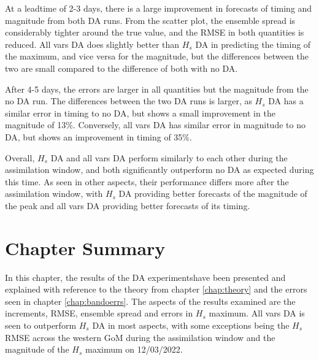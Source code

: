At a leadtime of 2-3 days, there is a large improvement in forecasts of timing and magnitude from both DA runs. From the scatter plot, the ensemble spread is considerably tighter around the true value, and the RMSE in both quantities is reduced. All vars DA does slightly better than $H_s$ DA in predicting the timing of the maximum, and vice versa for the magnitude, but the differences between the two are small compared to the difference of both with no DA.

After 4-5 days, the errors are larger in all quantities but the magnitude from the no DA run. The differences between the two DA runs is larger, as $H_s$ DA has a similar error in timing to no DA, but shows a small improvement in the magnitude of 13\%. Conversely, all vars DA has similar error in magnitude to no DA, but shows an improvement in timing of 35\%.

Overall, $H_s$ DA and all vars DA perform similarly to each other during the assimilation window, and both significantly outperform no DA as expected during this time. As seen in other aspects, their performance differs more after the assimilation window, with $H_s$ DA providing better forecasts of the magnitude of the peak and all vars DA providing better forecasts of its timing.

\section{Chapter Summary}

In this chapter, the results of the DA experimentshave been presented and explained with reference to the theory from chapter \ref{chap:theory} and the errors seen in chapter \ref{chap:bandoerrs}. The aspects of the results examined are the increments, RMSE, ensemble spread and errors in $H_s$ maximum. All vars DA is seen to outperform $H_s$ DA in most aspects, with some exceptions being the $H_s$ RMSE across the western GoM during the assimilation window and the magnitude of the $H_s$ maximum on 12/03/2022.
